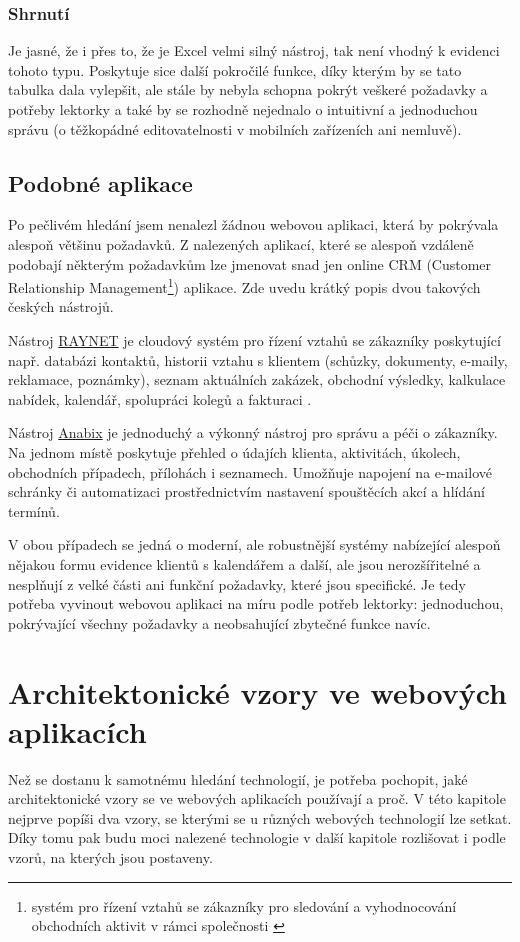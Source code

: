         \subsection{Shrnutí}
        Je jasné, že i přes to, že je Excel velmi silný nástroj, tak není vhodný k evidenci tohoto typu. Poskytuje sice další pokročilé funkce, díky kterým by se tato tabulka dala vylepšit, ale stále by nebyla schopna pokrýt veškeré požadavky a potřeby lektorky a také by se rozhodně nejednalo o intuitivní a jednoduchou správu (o těžkopádné editovatelnosti v mobilních zařízeních ani nemluvě).
    
    \section{Podobné aplikace}
    Po pečlivém hledání jsem nenalezl žádnou webovou aplikaci, která by pokrývala alespoň většinu požadavků. Z nalezených aplikací, které se alespoň vzdáleně podobají některým požadavkům lze jmenovat snad jen online CRM (Customer Relationship Management\footnote{systém pro řízení vztahů se zákazníky pro sledování a vyhodnocování obchodních aktivit v rámci společnosti \cite{crm}}) aplikace. Zde uvedu krátký popis dvou takových českých nástrojů.
    
    Nástroj \href{https://raynet.cz/}{RAYNET} je cloudový systém pro řízení vztahů se zákazníky poskytující např. databázi kontaktů, historii vztahu s klientem (schůzky, dokumenty, e-maily, reklamace, poznámky), seznam aktuálních zakázek, obchodní výsledky, kalkulace nabídek, kalendář, spolupráci kolegů a fakturaci \cite{raynet}.
    
    Nástroj \href{https://www.anabix.cz/}{Anabix} je jednoduchý a výkonný nástroj pro správu a péči o zákazníky. Na jednom místě poskytuje přehled o údajích klienta, aktivitách, úkolech, obchodních případech, přílohách i seznamech. Umožňuje napojení na e-mailové schránky či automatizaci prostřednictvím nastavení spouštěcích akcí a hlídání termínů. \cite{anabix}
    
    V obou případech se jedná o moderní, ale robustnější systémy nabízející alespoň nějakou formu evidence klientů s kalendářem a další, ale jsou nerozšířitelné a nesplňují z velké části ani funkční požadavky, které jsou specifické. Je tedy potřeba vyvinout webovou aplikaci na míru podle potřeb lektorky: jednoduchou, pokrývající všechny požadavky a neobsahující zbytečné funkce navíc.

\chapter{Architektonické vzory ve webových aplikacích}
Než se dostanu k samotnému hledání technologií, je potřeba pochopit, jaké architektonické vzory se ve webových aplikacích používají a proč. V této kapitole nejprve popíši dva vzory, se kterými se u různých webových technologií lze setkat. Díky tomu pak budu moci nalezené technologie v další kapitole rozlišovat i podle vzorů, na kterých jsou postaveny.

